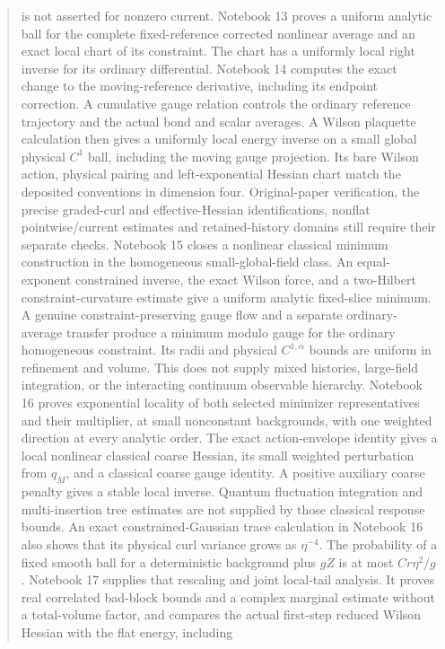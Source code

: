 \documentclass[11pt]{article}
\theoremstyle{remark}
\begin{document}
\begin{abstract}
is not asserted for nonzero current.
Notebook 13 proves a uniform analytic ball for the complete
fixed-reference corrected nonlinear average and an exact local
chart of its constraint. The chart has a uniformly local right
inverse for its ordinary differential.
Notebook 14 computes the exact change to the moving-reference
derivative, including its endpoint correction. A cumulative gauge
relation controls the ordinary reference trajectory and the actual
bond and scalar averages. A Wilson plaquette calculation then gives
a uniformly local energy inverse on a small global physical $C^1$
ball, including the moving gauge projection. Its bare Wilson action,
physical pairing and left-exponential Hessian chart match the
deposited conventions in dimension four. Original-paper verification,
the precise graded-curl and effective-Hessian identifications,
nonflat pointwise/current estimates and retained-history domains
still require their separate checks.
Notebook 15 closes a nonlinear classical minimum construction in
the homogeneous small-global-field class. An equal-exponent
constrained inverse, the exact Wilson force, and a two-Hilbert
constraint-curvature estimate give a uniform analytic fixed-slice
minimum. A genuine constraint-preserving gauge flow and a separate
ordinary-average transfer produce a minimum modulo gauge for the
ordinary homogeneous constraint. Its radii and physical
$C^{1,\alpha}$ bounds are uniform in refinement and volume.
This does not supply mixed histories, large-field integration,
or the interacting continuum observable hierarchy.
Notebook 16 proves exponential locality of both selected
minimizer representatives and their multiplier, at small
nonconstant backgrounds, with one weighted direction at every
analytic order. The exact action-envelope identity gives a local
nonlinear classical coarse Hessian, its small weighted perturbation
from $q_M$, and a classical coarse gauge identity. A positive
auxiliary coarse penalty gives a stable local inverse. Quantum
fluctuation integration and multi-insertion tree estimates are
not supplied by those classical response bounds.
An exact constrained-Gaussian trace calculation in Notebook 16
also shows that its physical curl variance grows as $\eta^{-4}$.
The probability of a fixed smooth ball for a deterministic
background plus $gZ$ is at most $C r\eta^2/g$.
Notebook 17 supplies that rescaling and joint local-tail analysis.
It proves real correlated bad-block bounds and a complex marginal
estimate without a total-volume factor, and compares the actual
first-step reduced Wilson Hessian with the flat energy, including

\end{abstract}
\end{document}
